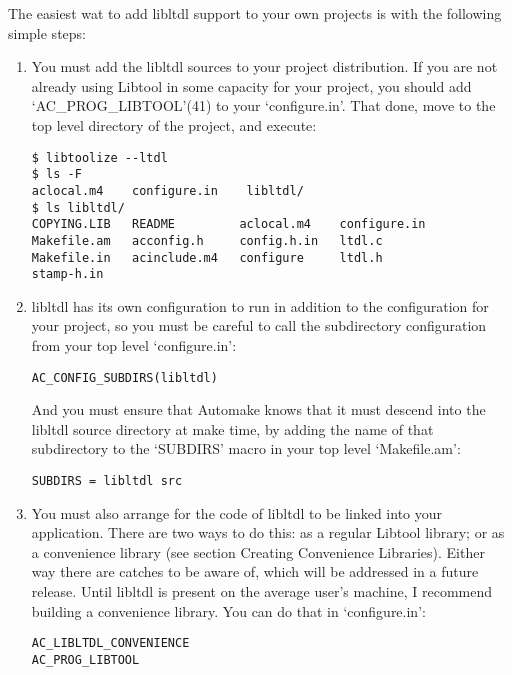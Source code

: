 The easiest wat to add libltdl support to your own projects is with the following simple steps:

\begin{enumerate}
\item You must add the libltdl sources to your project distribution. If you are not already using Libtool in some capacity for your project, you should add `AC\_{}PROG\_{}LIBTOOL'(41) to your `configure.in'. That done, move to the top level directory of the project, and execute:

 	
\begin{Verbatim}[frame=single]
$ libtoolize --ltdl
$ ls -F
aclocal.m4    configure.in    libltdl/
$ ls libltdl/
COPYING.LIB   README         aclocal.m4    configure.in   
Makefile.am   acconfig.h     config.h.in   ltdl.c  
Makefile.in   acinclude.m4   configure     ltdl.h 
stamp-h.in
\end{Verbatim}

\item libltdl has its own configuration to run in addition to the configuration for your project, so you must be careful to call the subdirectory configuration from your top level `configure.in':

\begin{Verbatim}[frame=single]
AC_CONFIG_SUBDIRS(libltdl)
\end{Verbatim}

And you must ensure that Automake knows that it must descend into the libltdl source directory at make time, by adding the name of that subdirectory to the `SUBDIRS' macro in your top level `Makefile.am':

\begin{Verbatim}[frame=single]
SUBDIRS = libltdl src
\end{Verbatim}

\item You must also arrange for the code of libltdl to be linked into your application. There are two ways to do this: as a regular Libtool library; or as a convenience library (see section Creating Convenience Libraries). Either way there are catches to be aware of, which will be addressed in a future release. Until libltdl is present on the average user's machine, I recommend building a convenience library. You can do that in `configure.in':

\begin{Verbatim}[frame=single]
AC_LIBLTDL_CONVENIENCE
AC_PROG_LIBTOOL
\end{Verbatim}


\end{enumerate}

